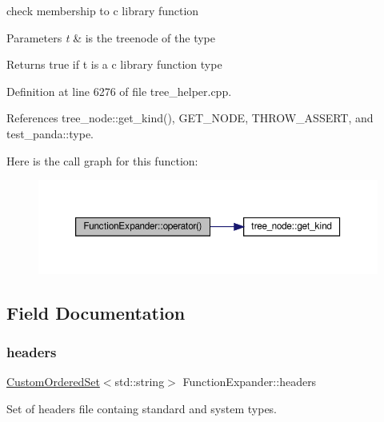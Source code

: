check membership to c library function 


\begin{DoxyParams}{Parameters}
{\em t} & is the treenode of the type \\
\hline
\end{DoxyParams}
\begin{DoxyReturn}{Returns}
true if t is a c library function type 
\end{DoxyReturn}


Definition at line 6276 of file tree\+\_\+helper.\+cpp.



References tree\+\_\+node\+::get\+\_\+kind(), G\+E\+T\+\_\+\+N\+O\+DE, T\+H\+R\+O\+W\+\_\+\+A\+S\+S\+E\+RT, and test\+\_\+panda\+::type.

Here is the call graph for this function\+:
\nopagebreak
\begin{figure}[H]
\begin{center}
\leavevmode
\includegraphics[width=350pt]{d5/d38/classFunctionExpander_a23c129a748b0eee89b666bf056162750_cgraph}
\end{center}
\end{figure}


\subsection{Field Documentation}
\mbox{\label{classFunctionExpander_a736cf8002692b5e0731b45865ee8f16e}} 
\subsubsection{\texorpdfstring{headers}{headers}}
{\footnotesize\ttfamily \hyperlink{classCustomOrderedSet}{Custom\+Ordered\+Set}$<$std\+::string$>$ Function\+Expander\+::headers\hspace{0.3cm}{\ttfamily [private]}}



Set of headers file containg standard and system types. 



